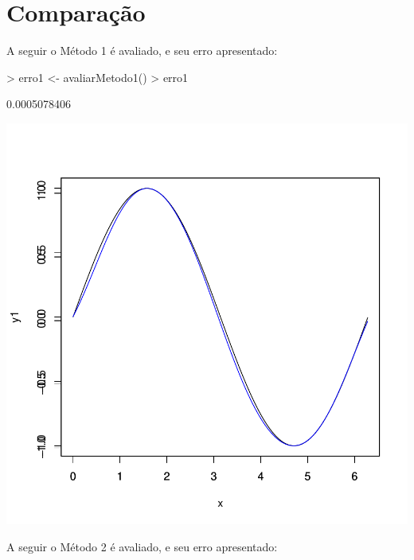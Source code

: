 \documentclass{article}
\begin{document}
\section{Comparação}

A seguir o Método 1 é avaliado, e seu erro apresentado:

\begin{Schunk}
\begin{Sinput}
>   erro1 <- avaliarMetodo1()
>   erro1
\end{Sinput}
\begin{Soutput}
[1] 0.0005078406
\end{Soutput}
\end{Schunk}
\includegraphics{mlppacotes-004}

A seguir o Método 2 é avaliado, e seu erro apresentado:
\end{document}
